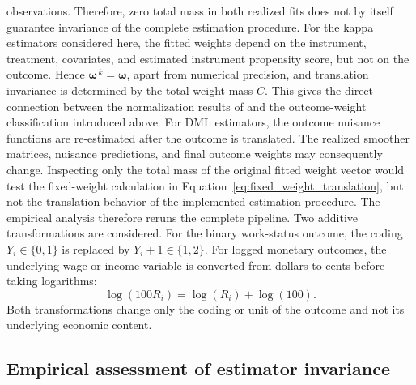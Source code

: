 \documentclass[12pt, a4paper, oneside]{article}
\theoremstyle{plain}
\theoremstyle{definition}
\begin{document}
observations. Therefore, zero total mass in both realized fits does not by
itself guarantee invariance of the complete estimation procedure.
For the kappa estimators considered here, the fitted weights depend on the
instrument, treatment, covariates, and estimated instrument propensity score,
but not on the outcome. Hence
\(\boldsymbol{\omega}^{\,k}=\boldsymbol{\omega}\), apart from numerical
precision, and translation invariance is determined by the total weight mass
\(C\). This gives the direct connection between the normalization results of
\citet{sloczynski2025abadie} and the outcome-weight classification introduced
above.
For DML estimators, the outcome nuisance functions are re-estimated after the
outcome is translated. The realized smoother matrices, nuisance predictions,
and final outcome weights may consequently change. Inspecting only the total
mass of the original fitted weight vector would test the fixed-weight
calculation in Equation~\eqref{eq:fixed_weight_translation}, but not the
translation behavior of the implemented estimation procedure. The empirical
analysis therefore reruns the complete pipeline.
Two additive transformations are considered. For the binary work-status
outcome, the coding \(Y_i\in\{0,1\}\) is replaced by
\(Y_i+1\in\{1,2\}\). For logged monetary outcomes, the underlying wage or
income variable is converted from dollars to cents before taking logarithms:
\begin{equation}
    \log(100R_i)=\log(R_i)+\log(100).
    \label{eq:dollars_to_cents}
\end{equation}
Both transformations change only the coding or unit of the outcome and not
its underlying economic content.



\subsection{Empirical assessment of estimator invariance}
\label{subsec:full_pipeline_invariance}
\end{document}
